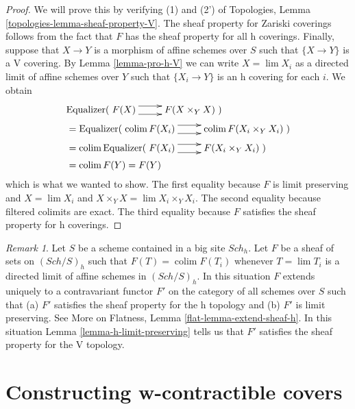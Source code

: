 \documentclass{stacks-project}
\theoremstyle{plain}
\theoremstyle{definition}
\theoremstyle{remark}
\newtheorem{remark}[subsection]{Remark}
\numberwithin{equation}{subsection}
\def\lim{\mathop{\mathrm{lim}}\nolimits}
\def\colim{\mathop{\mathrm{colim}}\nolimits}
\def\Sch{\mathit{Sch}}
\begin{document}
\begin{proof}
We will prove this by verifying (1) and (2') of
Topologies, Lemma \ref{topologies-lemma-sheaf-property-V}.
The sheaf property for Zariski coverings follows from
the fact that $F$ has the sheaf property for all h coverings.
Finally, suppose that $X \to Y$ is a morphism of affine schemes
over $S$ such that $\{X \to Y\}$ is a V covering.
By Lemma \ref{lemma-pro-h-V} we can write $X = \lim X_i$
as a directed limit of affine schemes
over $Y$ such that $\{X_i \to Y\}$ is an h covering for each $i$.
We obtain
\begin{align*}
&
\text{Equalizer}(
\xymatrix{
F(X) \ar@<1ex>[r] \ar@<-1ex>[r] &
F(X \times_Y X)
}
)
\\
& =
\text{Equalizer}(
\xymatrix{
\colim F(X_i) \ar@<1ex>[r] \ar@<-1ex>[r] &
\colim F(X_i \times_Y X_i)
}
)
\\
& =
\colim
\text{Equalizer}(
\xymatrix{
F(X_i) \ar@<1ex>[r] \ar@<-1ex>[r] &
F(X_i \times_Y X_i)
}
)
\\
& =
\colim F(Y) = F(Y)
\end{align*}
which is what we wanted to show.
The first equality because $F$ is limit preserving and $X = \lim X_i$ and
$X \times_Y X = \lim X_i \times_Y X_i$.
The second equality because filtered colimits are exact.
The third equality because $F$ satisfies the sheaf property
for h coverings.
\end{proof}

\begin{remark}
\label{remark-h-limit-preserving}
Let $S$ be a scheme contained in a big site $\Sch_h$. Let $F$ be a sheaf
of sets on $(\Sch/S)_h$ such that $F(T) = \colim F(T_i)$ whenever
$T = \lim T_i$ is a directed limit of affine schemes in $(\Sch/S)_h$.
In this situation $F$ extends uniquely to a contravariant functor $F'$
on the category of all schemes over $S$ such that (a) $F'$ satisfies the
sheaf property for the h topology and (b) $F'$ is limit preserving.
See More on Flatness, Lemma \ref{flat-lemma-extend-sheaf-h}.
In this situation Lemma \ref{lemma-h-limit-preserving}
tells us that $F'$ satisfies
the sheaf property for the V topology.
\end{remark}







\section{Constructing w-contractible covers}
\label{section-w-contractible}
\end{document}
